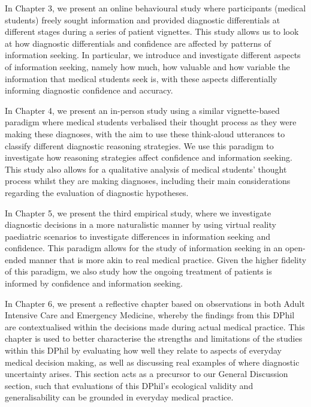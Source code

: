\documentclass[a4paper, nobind]{templates/ociamthesis}
\begin{document}
\hfill\break
In Chapter 3, we present an online behavioural study where participants (medical students) freely sought information and provided diagnostic differentials at different stages during a series of patient vignettes. This study allows us to look at how diagnostic differentials and confidence are affected by patterns of information seeking. In particular, we introduce and investigate different aspects of information seeking, namely how much, how valuable and how variable the information that medical students seek is, with these aspects differentially informing diagnostic confidence and accuracy.

\hfill\break
In Chapter 4, we present an in-person study using a similar vignette-based paradigm where medical students verbalised their thought process as they were making these diagnoses, with the aim to use these think-aloud utterances to classify different diagnostic reasoning strategies. We use this paradigm to investigate how reasoning strategies affect confidence and information seeking. This study also allows for a qualitative analysis of medical students' thought process whilst they are making diagnoses, including their main considerations regarding the evaluation of diagnostic hypotheses.

\hfill\break
In Chapter 5, we present the third empirical study, where we investigate diagnostic decisions in a more naturalistic manner by using virtual reality paediatric scenarios to investigate differences in information seeking and confidence. This paradigm allows for the study of information seeking in an open-ended manner that is more akin to real medical practice. Given the higher fidelity of this paradigm, we also study how the ongoing treatment of patients is informed by confidence and information seeking.

\hfill\break
In Chapter 6, we present a reflective chapter based on observations in both Adult Intensive Care and Emergency Medicine, whereby the findings from this DPhil are contextualised within the decisions made during actual medical practice. This chapter is used to better characterise the strengths and limitations of the studies within this DPhil by evaluating how well they relate to aspects of everyday medical decision making, as well as discussing real examples of where diagnostic uncertainty arises. This section acts as a precursor to our General Discussion section, such that evaluations of this DPhil's ecological validity and generalisability can be grounded in everyday medical practice.
\end{document}
